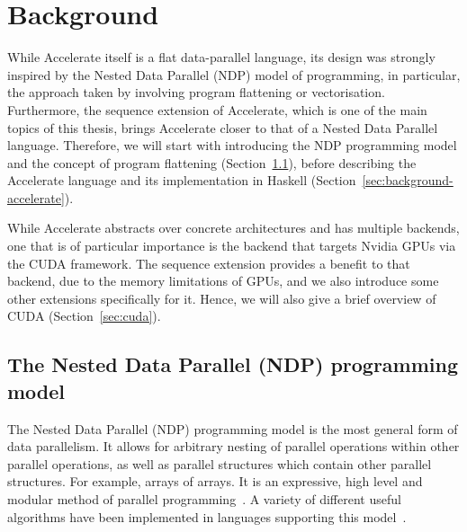 \chapter{Background}
\label{chap:background}

While Accelerate itself is a flat data-parallel language, its design was strongly inspired by the Nested Data Parallel (NDP) model of programming, in particular, the approach taken by \citet{Blelloch:compiling1988} involving program flattening or vectorisation. Furthermore, the sequence extension of Accelerate, which is one of the main topics of this thesis, brings Accelerate closer to that of a Nested Data Parallel language. Therefore, we will start with introducing the NDP programming model and the concept of program flattening (Section~\ref{sec:ndp}), before describing the Accelerate language and its implementation in Haskell (Section~\ref{sec:background-accelerate}).

While Accelerate abstracts over concrete architectures and has multiple backends, one that is of particular importance is the backend that targets Nvidia GPUs via the CUDA framework. The sequence extension provides a benefit to that backend, due to the memory limitations of GPUs, and we also introduce some other extensions specifically for it. Hence, we will also give a brief overview of CUDA (Section~\ref{sec:cuda}).



\section{The Nested Data Parallel (NDP) programming model}
\label{sec:ndp}

The Nested Data Parallel (NDP) programming model is the most general form of data parallelism. It allows for arbitrary nesting of parallel operations within other parallel operations, as well as parallel structures which contain other parallel structures. For example, arrays of arrays. It is an expressive, high level and modular method of parallel programming~\cite{Blelloch:1990vl}. A variety of different useful algorithms have been implemented in languages supporting this model~\cite{Blelloch:nbody94,Blelloch:delaunay96,Blelloch:connected94}.

